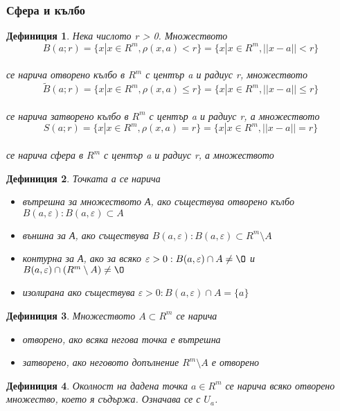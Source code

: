 \documentclass[fleqn]{article}
\newtheorem{definition}{Дефиниция}[subsection]
\begin{document}
\subsubsection{Сфера и кълбо}
	\begin{definition}
Нека числото r > 0. Множеството \\
$$B(a;r) = \{ x | x \in R^m, \rho(x,a) <r \} = \{ x| x \in R^m, || x-a || < r \}$$\\
се нарича отворено кълбо в $R^m$ с център a и радиус r, множеството \\
$$\widetilde B(a;r) = \{ x | x \in R^m, \rho(x,a) \leq r \} = \{ x| x \in R^m, || x-a || \leq r \}$$\\
се нарича затворено кълбо в $R^m$ с център a и радиус r, а множеството \\
$$S(a;r) = \{ x | x \in R^m, \rho(x,a) = r \} = \{ x| x \in R^m, || x-a || = r \}$$\\
се нарича сфера в $R^m$ с център a и радиус r, а множеството \\
	\end{definition}

	\begin{definition}
Точката а се нарича
\begin{itemize}
	\item вътрешна за множеството А, ако съществува отворено кълбо $B(a,\varepsilon): B(a,\varepsilon) \subset A$
	\item външна за А, ако съществува $B(a,\varepsilon): B(a,\varepsilon) \subset R^m \setminus  A$
	\item контурна за А, ако за всяко $\varepsilon > 0: B(a,\varepsilon) \cap A \neq \O $ и \\ $ B(a,\varepsilon) \cap (R^m \setminus  A) \neq \O$
	\item изолирана ако съществува $\varepsilon > 0: B(a,\varepsilon) \cap A = \{ a \}$
\end{itemize}
	\end{definition}

\begin{definition}
Множеството $A \subset R^m $ се нарича 
\begin{itemize}
	\item отворено, ако всяка негова точка е вътрешна 
	\item затворено, ако неговото допълнение  $R^m \setminus A$ е отворено
\end{itemize}
	\end{definition}

\begin{definition}
Околност на дадена точка $a \in R^m $ се нарича всяко отворено множество, което я съдържа. Означава се с $U_a$.
\end{definition}
\end{document}

